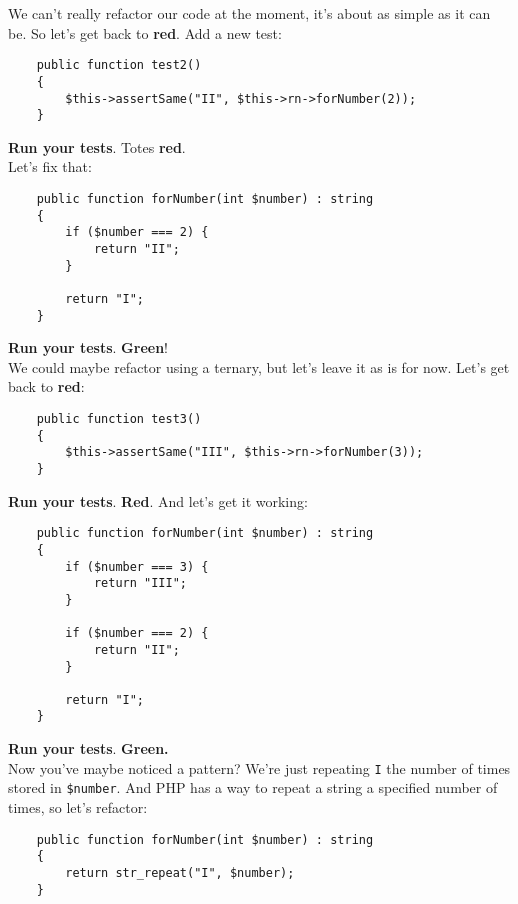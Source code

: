 We can't really refactor our code at the moment, it's about as simple as it can be. So let's get back to \textbf{red}. Add a new test:

\begin{verbatim}
    public function test2()
    {
        $this->assertSame("II", $this->rn->forNumber(2));
    }
\end{verbatim}

\textbf{Run your tests}. Totes \textbf{red}.
\\

Let's fix that:

\begin{verbatim}
    public function forNumber(int $number) : string
    {
        if ($number === 2) {
            return "II";
        }

        return "I";
    }
\end{verbatim}

\textbf{Run your tests}. \textbf{Green}!
\\

We could maybe refactor using a ternary, but let's leave it as is for now. Let's get back to \textbf{red}:

\begin{verbatim}
    public function test3()
    {
        $this->assertSame("III", $this->rn->forNumber(3));
    }
\end{verbatim}

\textbf{Run your tests}. \textbf{Red}. And let's get it working:

\begin{verbatim}
    public function forNumber(int $number) : string
    {
        if ($number === 3) {
            return "III";
        }

        if ($number === 2) {
            return "II";
        }

        return "I";
    }
\end{verbatim}

\textbf{Run your tests}. \textbf{Green.}
\\

Now you've maybe noticed a pattern? We're just repeating \texttt{I} the number of times stored in \texttt{\$number}. And PHP has a way to repeat a string a specified number of times, so let's refactor:

\begin{verbatim}
    public function forNumber(int $number) : string
    {
        return str_repeat("I", $number);
    }
\end{verbatim}

